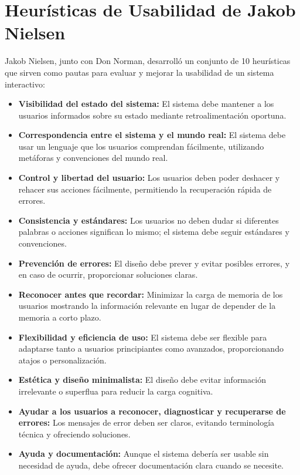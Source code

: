 \documentclass[10pt]{osa-supplemental-document}
\begin{document}
\section{Heurísticas de Usabilidad de Jakob Nielsen}
Jakob Nielsen, junto con Don Norman, desarrolló un conjunto de 10 heurísticas que sirven como pautas para evaluar y mejorar la usabilidad de un sistema interactivo:
\begin{itemize}
    \item \textbf{Visibilidad del estado del sistema:} El sistema debe mantener a los usuarios informados sobre su estado mediante retroalimentación oportuna.

    \item \textbf{Correspondencia entre el sistema y el mundo real:} El sistema debe usar un lenguaje que los usuarios comprendan fácilmente, utilizando metáforas y convenciones del mundo real.
    
    \item \textbf{Control y libertad del usuario:} Los usuarios deben poder deshacer y rehacer sus acciones fácilmente, permitiendo la recuperación rápida de errores.
    
    \item \textbf{Consistencia y estándares:} Los usuarios no deben dudar si diferentes palabras o acciones significan lo mismo; el sistema debe seguir estándares y convenciones.
    
    \item \textbf{Prevención de errores:} El diseño debe prever y evitar posibles errores, y en caso de ocurrir, proporcionar soluciones claras.
    
    \item \textbf{Reconocer antes que recordar:} Minimizar la carga de memoria de los usuarios mostrando la información relevante en lugar de depender de la memoria a corto plazo.
    
    \item \textbf{Flexibilidad y eficiencia de uso:} El sistema debe ser flexible para adaptarse tanto a usuarios principiantes como avanzados, proporcionando atajos o personalización.
    
    \item \textbf{Estética y diseño minimalista:} El diseño debe evitar información irrelevante o superflua para reducir la carga cognitiva.
    
    \item \textbf{Ayudar a los usuarios a reconocer, diagnosticar y recuperarse de errores:} Los mensajes de error deben ser claros, evitando terminología técnica y ofreciendo soluciones.
    
    \item \textbf{Ayuda y documentación:} Aunque el sistema debería ser usable sin necesidad de ayuda, debe ofrecer documentación clara cuando se necesite.
\end{itemize}
\end{document}
